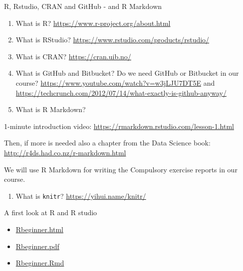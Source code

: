 \documentclass[10pt,ignorenonframetext,]{beamer}
\providecommand{\tightlist}{%
  \setlength{\itemsep}{0pt}\setlength{\parskip}{0pt}}
\begin{document}
\begin{frame}[fragile]

\begin{block}{R, Rstudio, CRAN and GitHub - and R Markdown}

\begin{enumerate}
\def\labelenumi{\arabic{enumi})}
\item
  What is R? \url{https://www.r-project.org/about.html}
\item
  What is RStudio? \url{https://www.rstudio.com/products/rstudio/}
\item
  What is CRAN? \url{https://cran.uib.no/}
\item
  What is GitHub and Bitbucket? Do we need GitHub or Bitbucket in our
  course? \url{https://www.youtube.com/watch?v=w3jLJU7DT5E} and
  \url{https://techcrunch.com/2012/07/14/what-exactly-is-github-anyway/}
\item
  What is R Markdown?
\end{enumerate}

1-minute introduction video:
\url{https://rmarkdown.rstudio.com/lesson-1.html}

Then, if more is needed also a chapter from the Data Science book:
\url{http://r4ds.had.co.nz/r-markdown.html}

We will use R Markdown for writing the Compulsory exercise reports in
our course.

\begin{enumerate}
\def\labelenumi{\arabic{enumi})}
\setcounter{enumi}{5}
\tightlist
\item
  What is \texttt{knitr}? \url{https://yihui.name/knitr/}
\end{enumerate}

\end{block}

\end{frame}

\begin{frame}

\begin{block}{A first look at R and R studio}

\begin{itemize}
\tightlist
\item
  \href{https://www.math.ntnu.no/emner/TMA4268/2019v/1Intro/Rbeginner.html}{Rbeginner.html}
\item
  \href{https://www.math.ntnu.no/emner/TMA4268/2019v/1Intro/Rbeginner.pdf}{Rbeginner.pdf}
\item
  \href{https://www.math.ntnu.no/emner/TMA4268/2019v/1Intro/Rbeginner.Rmd}{Rbeginner.Rmd}
\end{itemize}

\end{block}

\end{frame}
\end{document}
